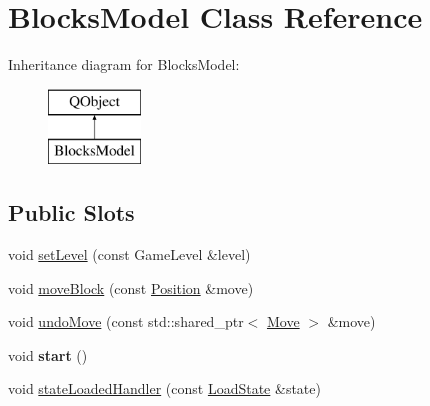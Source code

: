 \hypertarget{class_blocks_model}{}\section{Blocks\+Model Class Reference}
\label{class_blocks_model}
Inheritance diagram for Blocks\+Model\+:\begin{figure}[H]
\begin{center}
\leavevmode
\includegraphics[height=2.000000cm]{class_blocks_model}
\end{center}
\end{figure}
\subsection*{Public Slots}
\begin{DoxyCompactItemize}
\item 
void \mbox{\hyperlink{class_blocks_model_aa5ca46eacee24fe51864845ecf6a1266}{set\+Level}} (const Game\+Level \&level)
\item 
void \mbox{\hyperlink{class_blocks_model_abf01998c6ba41012b2ef6a457415b06c}{move\+Block}} (const \mbox{\hyperlink{struct_position}{Position}} \&move)
\item 
void \mbox{\hyperlink{class_blocks_model_a6707a7dac44d269c2d52e7904a7473ef}{undo\+Move}} (const std\+::shared\+\_\+ptr$<$ \mbox{\hyperlink{struct_move}{Move}} $>$ \&move)
\item 
\mbox{\label{class_blocks_model_a9bc356cf8f30e3cdaa94b8d7cf5d92f2}} 
void {\bfseries start} ()
\item 
void \mbox{\hyperlink{class_blocks_model_a9fc884d31e972c84e2e3dcbce73b8377}{state\+Loaded\+Handler}} (const \mbox{\hyperlink{struct_load_state}{Load\+State}} \&state)
\end{DoxyCompactItemize}

